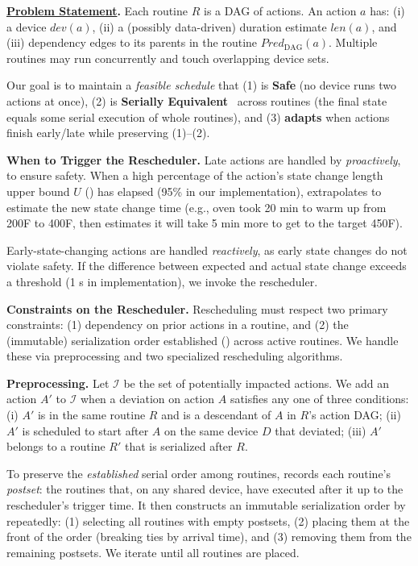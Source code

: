 \noindent \textbf{\underline{Problem Statement}. }
Each routine $R$ is a DAG of actions. An action $a$ has:
(i) a device $dev(a)$,
(ii) a (possibly data-driven) duration estimate $len(a)$, and
(iii) dependency edges to its parents in the routine $Pred_{\text{DAG}}(a)$.
Multiple routines may run concurrently and touch overlapping device sets.

Our goal is to maintain a {\it feasible schedule} that (1) is \textbf{Safe} (no device runs two actions at once), (2) is \textbf{Serially Equivalent}~\cite{SafeHomeEuroSys2021}  across routines (the final state equals some serial execution of whole routines), and (3) \textbf{adapts} when actions finish early/late while preserving (1)--(2).

\noindent \textbf{{When to Trigger the Rescheduler}. }
Late actions are handled by \sysname{} {\it proactively}, to ensure safety. When a high percentage of the action's state change length upper bound $U$ () has elapsed (95\% in our implementation), \sysname{} extrapolates to estimate the new state change time (e.g., oven took 20 min to warm up from 200\textdegree F to 400\textdegree F, then \sysname{} estimates it will take 5 min more to get to the target 450\textdegree F). 

Early-state-changing actions are handled
{\it reactively}, as early state changes do not violate safety. If the difference between expected and actual state change exceeds a threshold (1 s in implementation), we invoke the rescheduler. 

\noindent \textbf{{Constraints on the Rescheduler}. } 
Rescheduling must respect two primary constraints: (1) dependency on prior actions in a routine, and (2) the (immutable) serialization order established () across active routines. We handle these via preprocessing and two specialized rescheduling algorithms. 

\noindent \textbf{{Preprocessing}.}
Let $\mathcal{I}$ be the set of potentially impacted actions. 
We add an action $A'$ to $\mathcal{I}$ when a deviation on action $A$ satisfies any one of three conditions:
(i) $A'$ is in the same routine $R$ and is a descendant of $A$ in $R$'s action DAG;
(ii) $A'$ is scheduled to start after $A$ on the same device $D$ that deviated;
(iii) $A'$ belongs to a routine $R'$ that is serialized after $R$.

To preserve the \emph{established} serial order among routines, \sysname{} records each routine's \emph{postset}: the routines that, on any shared device, have executed after it up to the rescheduler's trigger time. It then constructs an immutable serialization order by repeatedly: (1) selecting all routines with empty postsets, (2) placing them at the front of the order (breaking ties by arrival time), and (3) removing them from the remaining postsets. We iterate until all routines are placed.

